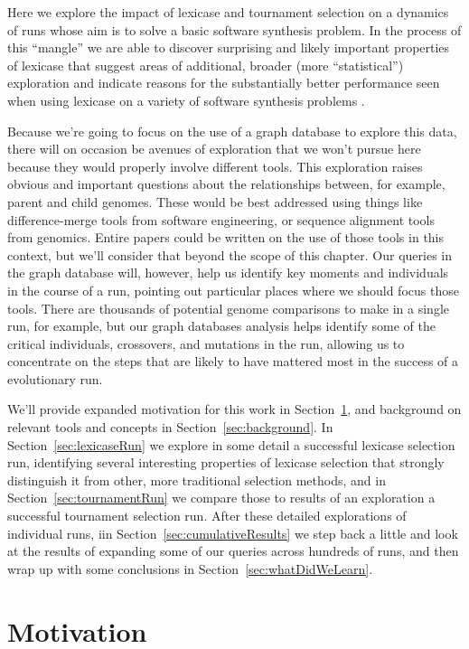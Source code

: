 Here we explore the impact of lexicase \citep{Helmuth:2015:ieeeTEC} and tournament selection 
on a dynamics of runs whose aim is to solve a basic software synthesis problem. 
In the process of this ``mangle'' we are able to discover surprising and likely important properties of
lexicase that suggest areas of additional, broader (more ``statistical'') exploration and indicate reasons
for the substantially better performance seen when using lexicase on a variety of software synthesis 
problems \citep{Helmuth:2015:GECCO}.

Because we're going to focus on the use of a graph database to explore this data, there will
on occasion be avenues of exploration that we won't pursue here because they would properly involve
different tools. This exploration raises obvious and important questions about the relationships between,
for example, parent and child genomes. These would be best addressed using things like 
difference-merge tools from software engineering, or sequence alignment tools from genomics.
Entire papers could be written on the use of those tools in this context, but we'll consider that
beyond the scope of this chapter. Our queries in the graph database will, however, help us identify key moments
and individuals in the course of a run, pointing out particular places where we should focus those tools. There are thousands
of potential genome comparisons to make in a single run, for example, but our graph databases analysis helps identify
some of the critical individuals, crossovers, and mutations in the run, allowing us to concentrate on the
steps that are likely to have mattered most in the success of a evolutionary run.

We'll provide expanded motivation for this work in Section~\ref{sec:motivation}, and background on relevant tools
and concepts in Section~\ref{sec:background}. In Section~\ref{sec:lexicaseRun} we explore in some detail a successful
lexicase selection run, identifying several interesting properties of lexicase selection that strongly distinguish it from
other, more traditional selection methods, and in Section~\ref{sec:tournamentRun} we compare those to results of 
an exploration a successful tournament selection run. After these detailed explorations of individual runs, iin
Section~\ref{sec:cumulativeResults} we step back a little and look at the results of expanding some of our queries
across hundreds of runs, and then wrap up with some conclusions in Section~\ref{sec:whatDidWeLearn}.

\section{Motivation}
\label{sec:motivation}

